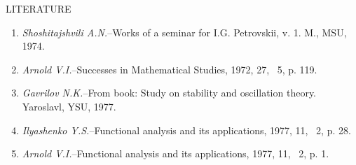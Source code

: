\documentclass[12pt]{amsart}
\begin{document}
\centerline{LITERATURE}
\vspace{1em}
\begin{enumerate}
\item\textit{Shoshitajshvili A.N.}--Works of a seminar for I.G. Petrovskii, v.
1. M., MSU, 1974.
\item\textit{Arnold V.I.}--Successes in Mathematical Studies, 1972, 27,
\textnumero~5, p. 119.
\item\textit{Gavrilov N.K.}--From book: Study on stability and oscillation 
theory. Yaroslavl, YSU, 1977.
\item\textit{Ilyashenko Y.S.}--Functional analysis and its applications, 1977,
11, \textnumero~2, p. 28.
\item\textit{Arnold V.I.}--Functional analysis and its applications, 1977, 11,
\textnumero~2, p. 1.
\end{enumerate}
\end{document}
